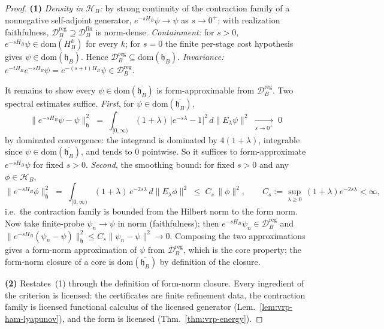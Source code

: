 \documentclass[12pt,oneside]{amsbook}
\theoremstyle{plain}
\theoremstyle{definition}
\theoremstyle{remark}
\begin{document}
\begin{proof}
\textbf{(1)}  \emph{Density in $\mathcal{H}_B$:} by strong
continuity of the contraction family of a nonnegative
self-adjoint generator, $e^{-sH_B}\psi \to \psi$ as
$s \to 0^+$; with realization faithfulness,
$\mathcal{D}_B^{\mathrm{reg}} \supseteq
\mathcal{D}_B^{\mathrm{fin}}$ is norm-dense.
\emph{Containment:} for $s > 0$, $e^{-sH_B}\psi \in
\mathrm{dom}(H_B^k)$ for every $k$; for $s = 0$ the finite
per-stage cost hypothesis gives
$\psi \in \mathrm{dom}(\mathfrak{h}_B)$.  Hence
$\mathcal{D}_B^{\mathrm{reg}} \subseteq
\mathrm{dom}(\overline{\mathfrak{h}_B})$.
\emph{Invariance:} $e^{-tH_B}e^{-sH_B}\psi =
e^{-(s+t)H_B}\psi \in \mathcal{D}_B^{\mathrm{reg}}$.

It remains to show every
$\psi \in \mathrm{dom}(\overline{\mathfrak{h}_B})$ is
form-approximable from $\mathcal{D}_B^{\mathrm{reg}}$.  Two
spectral estimates suffice.  \emph{First}, for
$\psi \in \mathrm{dom}(\overline{\mathfrak{h}_B})$,
\[
  \|e^{-sH_B}\psi - \psi\|_{\mathfrak{h}}^2
  \;=\; \int_{[0,\infty)} (1+\lambda)\,
  \bigl|e^{-s\lambda} - 1\bigr|^2 \, d\|E_\lambda\psi\|^2
  \;\xrightarrow[s\to 0^+]{}\; 0
\]
by dominated convergence: the integrand is dominated by
$4(1+\lambda)$, integrable since
$\psi \in \mathrm{dom}(\overline{\mathfrak{h}_B})$, and tends to
$0$ pointwise.  So it suffices to form-approximate
$e^{-sH_B}\psi$ for fixed $s > 0$.  \emph{Second}, the smoothing
bound: for fixed $s > 0$ and any $\phi \in \mathcal{H}_B$,
\[
  \|e^{-sH_B}\phi\|_{\mathfrak{h}}^2
  \;=\; \int_{[0,\infty)} (1+\lambda)\, e^{-2s\lambda}\,
  d\|E_\lambda\phi\|^2
  \;\le\; C_s\, \|\phi\|^2,
  \qquad
  C_s := \sup_{\lambda \ge 0}\,(1+\lambda)e^{-2s\lambda} < \infty,
\]
i.e.\ the contraction family is bounded from the Hilbert norm to
the form norm.  Now take finite-probe $\psi_n \to \psi$ in norm
(faithfulness); then $e^{-sH_B}\psi_n \in
\mathcal{D}_B^{\mathrm{reg}}$ and
$\|e^{-sH_B}(\psi_n - \psi)\|_{\mathfrak{h}}^2 \le
C_s \|\psi_n - \psi\|^2 \to 0$.  Composing the two
approximations gives a form-norm approximation of $\psi$ from
$\mathcal{D}_B^{\mathrm{reg}}$, which is the core property; the
form-norm closure of a core is
$\mathrm{dom}(\overline{\mathfrak{h}_B})$ by definition of the
closure.

\textbf{(2)}  Restates~(1) through the definition of form-norm
closure.  Every ingredient of the criterion is licensed: the
certificates are finite refinement data, the contraction family is
licensed functional calculus of the licensed generator
(Lem.~\ref{lem:vrp-ham-lyapunov}), and the form is licensed
(Thm.~\ref{thm:vrp-energy}).


\end{proof}
\end{document}
